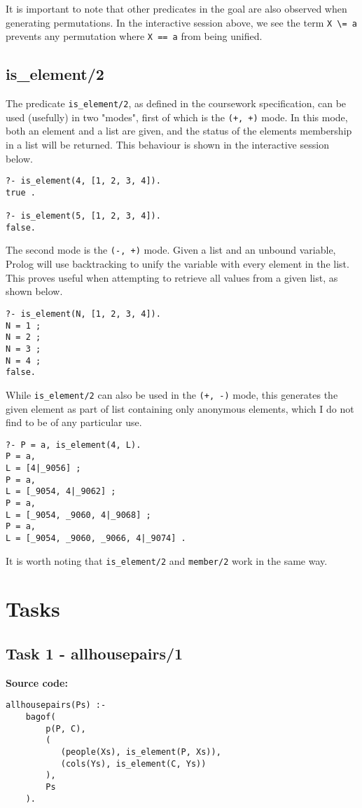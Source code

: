 \documentclass[11pt]{article}
\begin{document}
It is important to note that other predicates in the goal are also observed when generating permutations. In the interactive session above, we see the term {\verb|X \= a|} prevents any permutation where {\verb|X == a|} from being unified.

\newpage
\subsection{is\_element/2}
The predicate {\verb|is_element/2|}, as defined in the coursework specification, can be used (usefully) in two "modes", first of which is the {\verb|(+, +)|} mode. In this mode, both an element and a list are given, and the status of the elements membership in a list will be returned. This behaviour is shown in the interactive session below.
\begin{verbatim}
?- is_element(4, [1, 2, 3, 4]).
true .

?- is_element(5, [1, 2, 3, 4]).
false.
\end{verbatim}

The second mode is the {\verb|(-, +)|} mode. Given a list and an unbound variable, Prolog will use backtracking to unify the variable with every element in the list. This proves useful when attempting to retrieve all values from a given list, as shown below.
\begin{verbatim}
?- is_element(N, [1, 2, 3, 4]).
N = 1 ;
N = 2 ;
N = 3 ;
N = 4 ;
false.
\end{verbatim}

While {\verb|is_element/2|} can also be used in the {\verb|(+, -)|} mode, this generates the given element as part of list containing only anonymous elements, which I do not find to be of any particular use.
\begin{verbatim}
?- P = a, is_element(4, L).
P = a,
L = [4|_9056] ;
P = a,
L = [_9054, 4|_9062] ;
P = a,
L = [_9054, _9060, 4|_9068] ;
P = a,
L = [_9054, _9060, _9066, 4|_9074] .
\end{verbatim}

It is worth noting that {\verb|is_element/2|} and {\verb|member/2|} work in the same way.

\newpage
\section{Tasks}

\subsection{Task 1 - allhousepairs/1}
\textbf{Source code:}
\begin{verbatim}
allhousepairs(Ps) :- 
    bagof(
        p(P, C), 
        (
           (people(Xs), is_element(P, Xs)), 
           (cols(Ys), is_element(C, Ys))
        ), 
        Ps
    ).
\end{verbatim}
\end{document}
